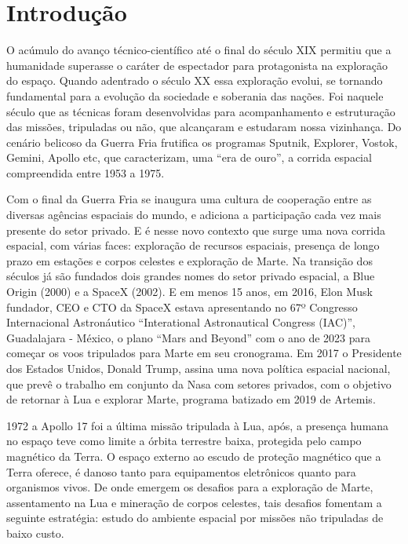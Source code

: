 \chapter*[Introdução]{Introdução}

O acúmulo do avanço técnico-científico até o final do século XIX permitiu que a humanidade  superasse o caráter de espectador para protagonista na exploração do espaço. Quando adentrado o século XX essa exploração evolui, se tornando fundamental para a evolução da sociedade e soberania das nações. Foi naquele século que as técnicas foram desenvolvidas para acompanhamento e estruturação das missões, tripuladas ou não, que alcançaram e estudaram nossa vizinhança. Do cenário belicoso da Guerra Fria frutifica os programas Sputnik, Explorer, Vostok, Gemini, Apollo etc, que caracterizam, uma “era de ouro”, a corrida espacial compreendida entre 1953 a 1975.

Com  o final da Guerra Fria se inaugura uma cultura de cooperação entre as diversas agências espaciais do mundo, e adiciona a participação cada vez mais presente do setor privado. E é nesse novo contexto que surge uma nova corrida espacial, com várias faces: exploração de recursos espaciais, presença de longo prazo em estações e corpos celestes e exploração de Marte. Na transição dos séculos já são fundados dois grandes nomes do setor privado espacial, a Blue Origin (2000) e a SpaceX (2002). E em menos 15 anos, em 2016, Elon Musk fundador, CEO e CTO da SpaceX estava apresentando no 67º Congresso Internacional Astronáutico “Interational Astronautical Congress (IAC)”, Guadalajara - México, o plano “Mars and Beyond” com o ano de 2023 para começar os voos tripulados para Marte em seu cronograma. Em 2017 o Presidente dos Estados Unidos, Donald Trump, assina uma nova política espacial nacional, que prevê o trabalho em conjunto da Nasa com setores privados, com o objetivo de retornar à Lua e explorar Marte, programa batizado em 2019 de Artemis.

1972 a Apollo 17 foi a última missão tripulada à Lua, após, a presença humana no espaço teve como limite a órbita terrestre baixa, protegida pelo campo magnético da Terra. O espaço externo ao escudo de proteção magnético que a Terra oferece, é danoso tanto para equipamentos eletrônicos quanto para organismos vivos. De onde emergem os desafios para a exploração de Marte, assentamento na Lua e mineração de corpos celestes, tais desafios fomentam a seguinte estratégia: estudo do ambiente espacial por missões não tripuladas de baixo custo.

